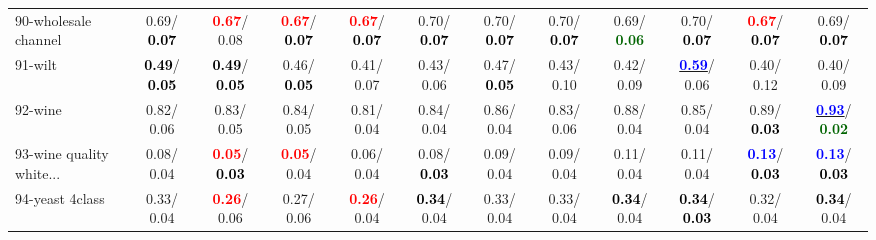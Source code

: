 \begin{table}[h]
\begin{center}
{\begin{tabular}{lc|c|c|c|c|c|c|c|c|c|c}
90-wholesale channel &   0.69/\textcolor{black}{\textbf{  0.07}} & \textcolor{red}{\textbf{  0.67}}/  0.08 & \textcolor{red}{\textbf{  0.67}}/\textcolor{black}{\textbf{  0.07}} & \textcolor{red}{\textbf{  0.67}}/\textcolor{black}{\textbf{  0.07}} &   0.70/\textcolor{black}{\textbf{  0.07}} &   0.70/\textcolor{black}{\textbf{  0.07}} &   0.70/\textcolor{black}{\textbf{  0.07}} &   0.69/\textcolor{darkgreen}{\textbf{  0.06}} &   0.70/\textcolor{black}{\textbf{  0.07}} & \textcolor{red}{\textbf{  0.67}}/\textcolor{black}{\textbf{  0.07}} &   0.69/\textcolor{black}{\textbf{  0.07}} \\
91-wilt & \textcolor{black}{\textbf{  0.49}}/\textcolor{black}{\textbf{  0.05}} & \textcolor{black}{\textbf{  0.49}}/\textcolor{black}{\textbf{  0.05}} &   0.46/\textcolor{black}{\textbf{  0.05}} &   0.41/  0.07 &   0.43/  0.06 &   0.47/\textcolor{black}{\textbf{  0.05}} &   0.43/  0.10 &   0.42/  0.09 & \underline{\textcolor{blue}{\textbf{  0.59}}}/  0.06 &   0.40/  0.12 &   0.40/  0.09 \\
92-wine &   0.82/  0.06 &   0.83/  0.05 &   0.84/  0.05 &   0.81/  0.04 &   0.84/  0.04 &   0.86/  0.04 &   0.83/  0.06 &   0.88/  0.04 &   0.85/  0.04 &   0.89/\textcolor{black}{\textbf{  0.03}} & \underline{\textcolor{blue}{\textbf{  0.93}}}/\textcolor{darkgreen}{\textbf{  0.02}} \\ \hline
93-wine quality white... &   0.08/  0.04 & \textcolor{red}{\textbf{  0.05}}/\textcolor{black}{\textbf{  0.03}} & \textcolor{red}{\textbf{  0.05}}/  0.04 &   0.06/  0.04 &   0.08/\textcolor{black}{\textbf{  0.03}} &   0.09/  0.04 &   0.09/  0.04 &   0.11/  0.04 &   0.11/  0.04 & \textcolor{blue}{\textbf{  0.13}}/\textcolor{black}{\textbf{  0.03}} & \textcolor{blue}{\textbf{  0.13}}/\textcolor{black}{\textbf{  0.03}} \\
94-yeast 4class &   0.33/  0.04 & \textcolor{red}{\textbf{  0.26}}/  0.06 &   0.27/  0.06 & \textcolor{red}{\textbf{  0.26}}/  0.04 & \textcolor{black}{\textbf{  0.34}}/  0.04 &   0.33/  0.04 &   0.33/  0.04 & \textcolor{black}{\textbf{  0.34}}/  0.04 & \textcolor{black}{\textbf{  0.34}}/\textcolor{black}{\textbf{  0.03}} &   0.32/  0.04 & \textcolor{black}{\textbf{  0.34}}/  0.04 \\\end{tabular}
}\label{strats2bSVM}
\end{center}
\end{table}
                                     